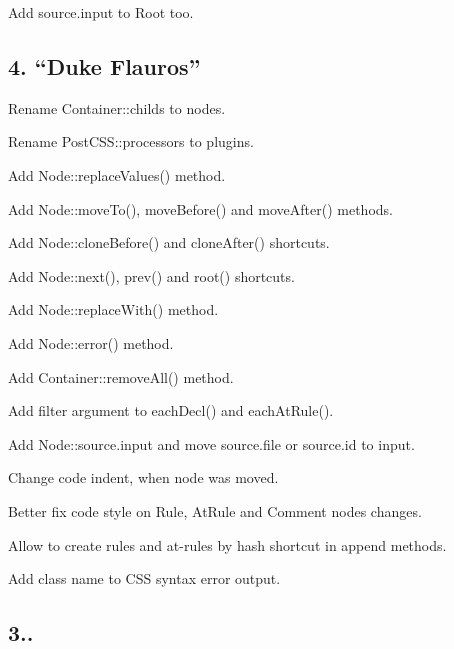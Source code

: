 \begin{DoxyItemize}
\item Add {\ttfamily source.\+input} to {\ttfamily Root} too.
\end{DoxyItemize}

\subsection*{4. “\+Duke Flauros”}


\begin{DoxyItemize}
\item Rename {\ttfamily Container\+::childs} to {\ttfamily nodes}.
\item Rename {\ttfamily Post\+C\+S\+S\+::processors} to {\ttfamily plugins}.
\item Add {\ttfamily Node\+::replace\+Values()} method.
\item Add {\ttfamily Node\+::move\+To()}, {\ttfamily move\+Before()} and {\ttfamily move\+After()} methods.
\item Add {\ttfamily Node\+::clone\+Before()} and {\ttfamily clone\+After()} shortcuts.
\item Add {\ttfamily Node\+::next()}, {\ttfamily prev()} and {\ttfamily root()} shortcuts.
\item Add {\ttfamily Node\+::replace\+With()} method.
\item Add {\ttfamily Node\+::error()} method.
\item Add {\ttfamily Container\+::remove\+All()} method.
\item Add filter argument to {\ttfamily each\+Decl()} and {\ttfamily each\+At\+Rule()}.
\item Add {\ttfamily Node\+::source.\+input} and move {\ttfamily source.\+file} or {\ttfamily source.\+id} to {\ttfamily input}.
\item Change code indent, when node was moved.
\item Better fix code style on {\ttfamily Rule}, {\ttfamily At\+Rule} and {\ttfamily Comment} nodes changes.
\item Allow to create rules and at-\/rules by hash shortcut in append methods.
\item Add class name to C\+SS syntax error output.
\end{DoxyItemize}

\subsection*{3..}


